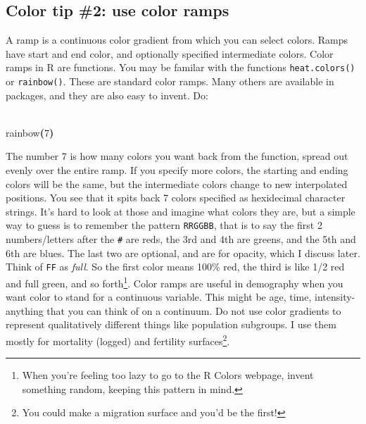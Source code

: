 \documentclass[a4paper]{article}
\newcommand{\hlnumber}[1]{\textcolor[rgb]{0.0823529411764706,0.0784313725490196,0.709803921568627}{#1}}%
\newcommand{\hlfunctioncall}[1]{\textcolor[rgb]{1,0,0}{#1}}%
\newcommand{\hlkeyword}[1]{\textcolor[rgb]{0,0,0}{\textbf{#1}}}%
\newcommand{\hlprompt}[1]{\textcolor[rgb]{0,0,0}{#1}}%
\newcommand{\hlstd}[1]{\textcolor[rgb]{0,0,0}{#1}}%
\newenvironment{Houtput}{\raggedright}{%
%
}
\renewenvironment{Schunk}{\vspace{\topsep}}{\vspace{\topsep}}
\begin{document}
\subsection{Color tip \#2: use color ramps}
A ramp is a continuous color gradient from which you can select colors. Ramps have start and end color, and optionally specified intermediate colors. Color ramps in R are functions. You may be familar with the functions \texttt{heat.colors()} or \texttt{rainbow()}. These are standard color ramps. Many others are available in packages, and they are also easy to invent. Do:

\begin{Houtput}
\hspace*{\fill}\\
\hlstd{}\ttfamily\noindent
\hlprompt{\usebox{\hlnormalsizeboxgreaterthan}{\ }}\hlfunctioncall{rainbow}\hlkeyword{(}\hlnumber{7}\hlkeyword{)}\mbox{}
\normalfont
\hspace*{\fill}\\
\hlstd{}\begin{Schunk}

\end{Schunk}
\end{Houtput}

The number 7 is how many colors you want back from the function, spread out evenly over the entire ramp. If you specify more colors, the starting and ending colors will be the same, but the intermediate colors change to new interpolated positions. You see that it spits back 7 colors specified as hexidecimal character strings. It's hard to look at those and imagine what colors they are, but a simple way to guess is to remember the pattern \texttt{RRGGBB}, that is to say the first 2 numbers/letters after the \texttt{\#} are reds, the 3rd and 4th are greens, and the 5th and 6th are blues. The last two are optional, and are for opacity, which I discuss later. Think of \texttt{FF} as \textit{full}. So the first color means 100\% red, the third is like 1/2 red and full green, and so forth\footnote{When you're feeling too lazy to go to the R Colors webpage, invent something random, keeping this pattern in mind.}. Color ramps are useful in demography when you want color to stand for a continuous variable. This might be age, time, intensity- anything that you can think of on a continuum. Do not use color gradients to represent qualitatively different things like population subgroups. I use them mostly for mortality (logged) and fertility surfaces\footnote{You could make a migration surface and you'd be the first!}.\\
 
\end{document}
